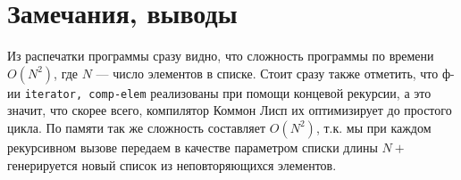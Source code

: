 \documentclass[12pt]{article}
\begin{document}
\section{Замечания, выводы}
Из распечатки программы сразу видно, что сложность программы по времени $O(N^2)$, где $N$ --- число элементов в списке. Стоит сразу также отметить, что ф-ии {\color{blue}\tt{iterator, comp-elem}} реализованы при помощи концевой рекурсии, а это значит, что скорее всего, компилятор Коммон Лисп их оптимизирует до простого цикла. По памяти так же сложность составляет $O(N^2)$, т.к. мы при каждом рекурсивном вызове передаем в качестве параметром списки длины $N +$ генерируется новый список из неповторяющихся элементов.
\end{document}
